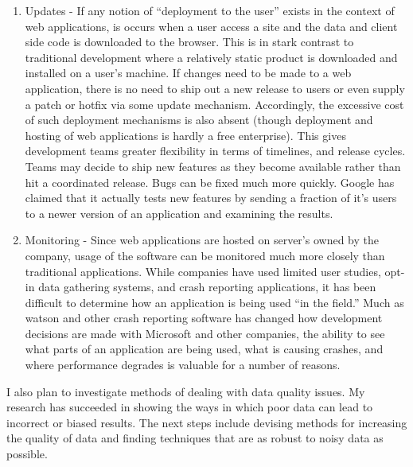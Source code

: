 \documentclass[10pt]{article}
\begin{document}
\begin{small}
\begin{enumerate}
\item Updates - If any notion of ``deployment to the user'' exists in the context of web applications,
    is occurs when a user access a site and the data and client side code is downloaded to the 
    browser.  This is in stark contrast to traditional development where a relatively static
    product is downloaded and installed on a user's machine.  If changes need to be made to a web
    application, there is no need to ship out a new release to users or even supply a patch or hotfix
    via some update mechanism.  Accordingly, the excessive cost of such deployment mechanisms is also
    absent (though deployment and hosting of web applications is hardly a free enterprise).  This gives
    development teams greater flexibility in terms of timelines, and release cycles.  Teams may decide
    to ship new features as they become available rather than hit a coordinated release.  Bugs can be fixed
    much more quickly.  Google has claimed that it actually tests new features by sending a fraction of it's
    users to a newer version of an application and examining the results.

\item Monitoring - Since web applications are hosted on server's owned by the company, usage of the software
    can be monitored much more closely than traditional applications.  While companies have used limited
    user studies, opt-in data gathering systems, and crash reporting applications, it has been difficult
    to determine how an application is being used ``in the field.'' Much as watson and other crash
    reporting software has changed how development decisions are made with Microsoft and other companies,
    the ability to see what parts of an application are being used, what is causing crashes, and where
    performance degrades is valuable for a number of reasons.  

\end{enumerate}


I also plan to investigate methods of dealing with data quality issues.  My
research has succeeded in showing the ways in which poor data can lead to
incorrect or biased results.  The next steps include devising methods for
increasing the quality of data and finding techniques that are as robust to
noisy data as possible.


\vspace{0.5cm}

\end{small}

\begin{footnotesize}




\end{footnotesize}
\end{document}
